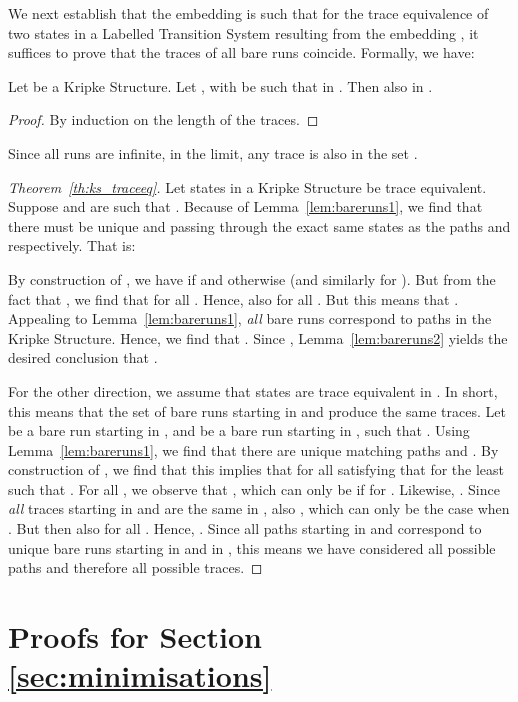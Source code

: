 \documentclass{llncs}
\begin{document}
We next establish that the embedding  is such that for the trace
equivalence of two states in a Labelled Transition System resulting from
the embedding , it suffices to prove that the traces of all bare runs
coincide.  Formally, we have:

\begin{lemma}
\label{lem:bareruns2}
Let  be a Kripke Structure. Let , with  be such that  in . Then also  in .

\end{lemma}

\begin{proof} By induction on the length of the traces.
\end{proof}
Since all runs are infinite, in the limit, any trace  is also in the set .


\begin{proof}[Theorem~\ref{th:ks_traceeq}]
Let states  in a Kripke Structure be trace equivalent.
Suppose  and  are such that . Because of Lemma~\ref{lem:bareruns1}, we find that there
must be unique  and 
passing through the exact same states as the paths  and 
respectively. That is:

By construction of , we have  if
 and  otherwise (and similarly for
). But from
the fact that , we find that  for all . Hence, also  for all . But
this means that . Appealing to
Lemma~\ref{lem:bareruns1}, \emph{all} bare runs correspond to paths
in the Kripke Structure. Hence, we find that
. Since , Lemma~\ref{lem:bareruns2} yields the desired conclusion that
.

For the other direction, we assume that states  are
trace equivalent in . In short, this means that the set of
bare runs starting in  and  produce the same traces. Let
 be a bare run starting in ,
and  be a bare run starting in
, such that . Using Lemma~\ref{lem:bareruns1}, we find
that there are unique matching paths 
and .
By construction of , we find that
this implies that  for all  satisfying that 
for the least  such that . For all , we
observe that , which can only be if
 for . Likewise, .
Since \emph{all} traces starting in  and  are the same in
, also ,
which can only be the case when . But then also
 for all . Hence, .
Since all paths starting in
 and  correspond to unique bare runs starting in  and 
in , this means we have considered all possible paths and
therefore all possible traces.
\end{proof}



\section{Proofs for Section \ref{sec:minimisations}}
\end{document}
